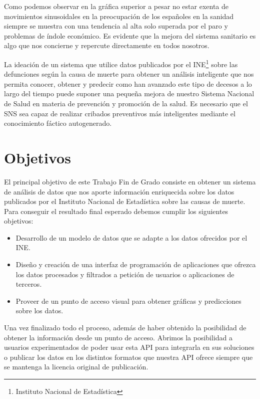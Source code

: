Como podemos observar en la gráfica superior a pesar no estar exenta de movimientos sinusoidales 
en la preocupación de los españoles en la sanidad siempre se muestra con una tendencia al alta 
solo superada por el paro y problemas de índole económico. 
Es evidente que la mejora del sistema sanitario es algo que nos concierne y repercute 
directamente en todos nosotros.

La ideación de un sistema que utilice datos publicados por el INE\footnote{Instituto Nacional de Estadística} sobre las defunciones según 
la causa de muerte para obtener un análisis inteligente que nos permita conocer, obtener y predecir
como han avanzado este tipo de decesos a lo largo del tiempo puede suponer una pequeña mejora de 
nuestro Sistema Nacional de Salud en materia de prevención y promoción de la salud. Es necesario que el 
SNS sea capaz de realizar cribados preventivos más inteligentes mediante el conocimiento fáctico autogenerado.

\section{Objetivos}
El principal objetivo de este Trabajo Fin de Grado consiste en obtener un sistema de análisis de datos que nos aporte
información enriquecida sobre los datos publicados por el Instituto Nacional de Estadística sobre las causas de muerte. 
Para conseguir el resultado final esperado debemos cumplir los siguientes objetivos:
\begin{itemize}
    \item Desarrollo de un modelo de datos que se adapte a los datos ofrecidos por el INE.
    \item Diseño y creación de una interfaz de programación de aplicaciones que ofrezca los datos procesados y
filtrados a petición de usuarios o aplicaciones de terceros.
    \item Proveer de un punto de acceso visual para obtener gráficas y predicciones sobre los datos.
\end{itemize}

Una vez finalizado todo el proceso, además de haber obtenido la posibilidad de obtener la información 
desde un punto de acceso. Abrimos la posibilidad a usuarios experimentados de poder usar esta API para 
integrarla en sus soluciones o publicar los datos en los distintos formatos que nuestra API ofrece 
siempre que se mantenga la licencia original de publicación.


